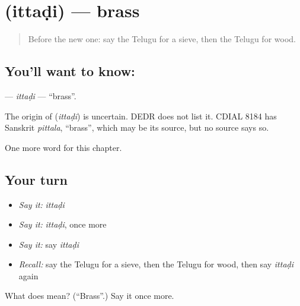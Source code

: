 \section[\texorpdfstring{\te{ఇత్తడి} (ittaḍi)}{ఇత్తడి (ittaḍi)}]{ (ittaḍi) — brass}

\label{lesson:TE-C269-ittadi}



\begin{quote}
Before the new one: say the Telugu for a sieve, then the Telugu for wood.
\end{quote}

\subsection*{You'll want to know: }
\textbf{} — \emph{ittaḍi} — \textquotedblleft{}brass\textquotedblright{}.

\begin{cousinweb}
The origin of \textbf{} (\emph{ittaḍi}) is uncertain. DEDR does not list it. CDIAL 8184 has Sanskrit \emph{pittala}, \textquotedblleft{}brass\textquotedblright{}, which may be its source, but no source says so.
\end{cousinweb}

\begin{grammarlens}[title={What you've built}]
One more word for this chapter.
\end{grammarlens}

\subsection*{Your turn}
\begin{itemize}
\raggedright
  \item \emph{Say it:} \emph{ittaḍi}
  \item \emph{Say it:} \emph{ittaḍi}, once more
  \item \emph{Say it:} say \emph{ittaḍi}
  \item \emph{Recall:} say the Telugu for a sieve, then the Telugu for wood, then say \emph{ittaḍi} again
\end{itemize}

\begin{tcolorbox}[breakable,colback=teal!4,colframe=teal!35!black,title={Before you move on}]
What does  mean? (\textquotedblleft{}Brass\textquotedblright{}.) Say it once more.
\end{tcolorbox}
